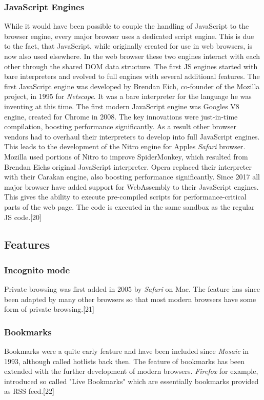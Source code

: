 \documentclass[runningheads]{llncs}
\begin{document}
			\subsubsection{JavaScript Engines} \leavevmode\newline
			While it would have been possible to couple the handling of JavaScript to the browser engine, every major browser uses a dedicated script engine. This is due to the fact, that JavaScript, while originally created for use in web browsers, is now also used elsewhere. In the web browser these two engines interact with each other through the shared DOM data structure.
			The first JS engines started with bare interpreters and evolved to full engines with several additional features. The first JavaScript engine was developed by Brendan Eich, co-founder of the Mozilla project, in 1995 for \textit{Netscape}. It was a bare interpreter for the language he was inventing at this time. The first modern JavaScript engine was Googles V8 engine, created for Chrome in 2008. The key innovations were just-in-time compilation, boosting performance significantly. As a result other browser vendors had to overhaul their interpreters to develop into full JavaScript engines. This leads to the development of the Nitro engine for Apples \textit{Safari} browser. Mozilla used portions of Nitro to improve SpiderMonkey, which resulted from Brendan Eichs original JavaScript interpreter. Opera replaced their interpreter with their Carakan engine, also boosting performance significantly.
			Since 2017 all major browser have added support for WebAssembly to their JavaScript engines. This gives the ability to execute pre-compiled scripts for performance-critical parts of the web page. The code is executed in the same sandbox as the regular JS code.[20]

		\subsection{Features}
			\subsubsection{Incognito mode}
			\leavevmode\newline
			Private browsing was first added in 2005 by \textit{Safari} on Mac. The feature has since been adapted by many other browsers so that most modern browsers have some form of private browsing.[21]
			\subsubsection{Bookmarks}
			\leavevmode\newline
			Bookmarks were a quite early feature and have been included since \textit{Mosaic} in 1993, although called hotlists back then. The feature of bookmarks has been extended with the further development of modern browsers. \textit{Firefox} for example, introduced so called "Live Bookmarks" which are essentially bookmarks provided as RSS feed.[22]
\end{document}
